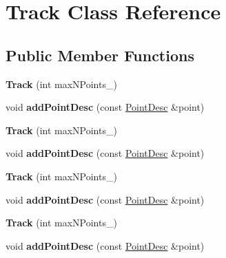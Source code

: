 \hypertarget{class_track}{
\section{Track Class Reference}
\label{class_track}
}
\subsection*{Public Member Functions}
\begin{DoxyCompactItemize}
\item 
\hypertarget{class_track_a867e2950cedd4d9e7d09d368902fc641}{
{\bfseries Track} (int maxNPoints\_\-)}
\label{class_track_a867e2950cedd4d9e7d09d368902fc641}

\item 
\hypertarget{class_track_a8f94483584b8918b5f9ae87656693eb8}{
void {\bfseries addPointDesc} (const \hyperlink{class_point_desc}{PointDesc} \&point)}
\label{class_track_a8f94483584b8918b5f9ae87656693eb8}

\item 
\hypertarget{class_track_a867e2950cedd4d9e7d09d368902fc641}{
{\bfseries Track} (int maxNPoints\_\-)}
\label{class_track_a867e2950cedd4d9e7d09d368902fc641}

\item 
\hypertarget{class_track_a8f94483584b8918b5f9ae87656693eb8}{
void {\bfseries addPointDesc} (const \hyperlink{class_point_desc}{PointDesc} \&point)}
\label{class_track_a8f94483584b8918b5f9ae87656693eb8}

\item 
\hypertarget{class_track_a867e2950cedd4d9e7d09d368902fc641}{
{\bfseries Track} (int maxNPoints\_\-)}
\label{class_track_a867e2950cedd4d9e7d09d368902fc641}

\item 
\hypertarget{class_track_a8f94483584b8918b5f9ae87656693eb8}{
void {\bfseries addPointDesc} (const \hyperlink{class_point_desc}{PointDesc} \&point)}
\label{class_track_a8f94483584b8918b5f9ae87656693eb8}

\item 
\hypertarget{class_track_a867e2950cedd4d9e7d09d368902fc641}{
{\bfseries Track} (int maxNPoints\_\-)}
\label{class_track_a867e2950cedd4d9e7d09d368902fc641}

\item 
\hypertarget{class_track_a8f94483584b8918b5f9ae87656693eb8}{
void {\bfseries addPointDesc} (const \hyperlink{class_point_desc}{PointDesc} \&point)}
\label{class_track_a8f94483584b8918b5f9ae87656693eb8}

\end{DoxyCompactItemize}
